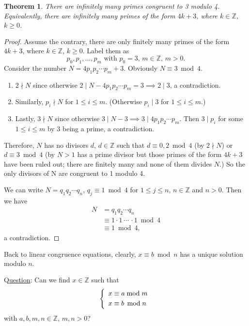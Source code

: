 \documentclass{amsbook}
\theoremstyle{plain}
\newtheorem{theorem}{Theorem}[chapter] %
\theoremstyle{definition}
\theoremstyle{remark}
\numberwithin{equation}{chapter}
\numberwithin{figure}{chapter}
\newcommand{\Z}{\mathbb{Z}}
\begin{document}
\begin{theorem}
  There are infinitely many primes congruent to 3 modulo 4. Equivalently, there are infinitely many primes of the form $4k+3$, where $k \in \Z$, $k \geqslant 0$.
\end{theorem}
\begin{proof}
  Assume the contrary, there are only finitely many primes of the form $4k+3$, where $k \in \Z$, $ k \geqslant 0$. Label them as 
\[
p_0, p_1, \ldots, p_m \text{ with $p_0 = 3$, $m \in \Z$, $m > 0$.}
\]
Consider the number $N = 4p_1p_2\cdots p_m + 3$. Obviously $N \equiv 3 \bmod 4$.

\begin{enumerate}[label=(\roman*)]
\item $2 \nmid N$ since otherwise $2 \mid N - 4p_1p_2 \cdots p_m = 3 \implies 2 \mid 3$, a contradiction. 
\item Similarly, $p_i \nmid N$ for $1 \leqslant i \leqslant m$. (Otherwise $p_i \mid 3$ for $1 \leqslant i \leqslant m$.) 
\item Lastly, $3 \nmid N$ since otherwise $3 \mid N - 3 \implies 3 \mid 4p_1p_2 \cdots p_m$. Then $3 \mid p_i$ for some $1 \leqslant i \leqslant m$ by 3 being a prime, a contradiction.
\end{enumerate}
Therefore, $N$ has no divisors $d$, $d \in \Z$ such that $d \equiv 0, 2 \bmod 4$ (by $2 \nmid N$) or $d \equiv 3 \bmod 4$ (by $N > 1$ has a prime divisor but those primes of the form $4k+3$ have been ruled out; there are finitely many and none of them divides $N$.) So the only divisors of N are congruent to 1 modulo 4. 

We can write $N = q_1q_2 \cdots q_n$, $q_j \equiv 1 \bmod 4$ for $1 \leqslant j \leqslant n$, $n \in \Z$ and $n > 0$. Then we have 
\begin{align}
  N &= q_1 q_2 \cdots q_n \\
    &\equiv 1 \cdot 1 \, \cdots\, \cdot 1 \bmod 4 \\
    &\equiv 1 \bmod 4,
\end{align}
a contradiction.
\end{proof}

Back to linear congruence equations, clearly, $x \equiv b \bmod n$ has a unique solution modulo $n$.

Q\underline{uestion}: Can we find $x \in \Z$ such that
\begin{align}
  \left\{ \begin{array}{l}
            x \equiv a \bmod m \\[1mm]
            x \equiv b \hspace{.6mm} \bmod n
          \end{array}\right. 
\end{align} 
with $a, b, m, n \in \Z$, $m, n > 0$?
\end{document}
